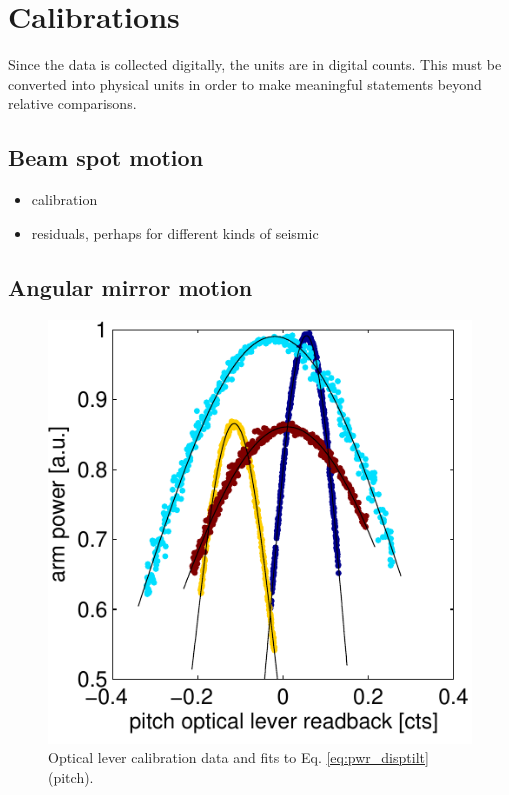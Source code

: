 \section{Calibrations}
Since the data is collected digitally, the units are in digital
counts. This must be converted into physical units in order to make
meaningful statements beyond relative comparisons.

\subsection{Beam spot motion}
\begin{itemize} 
\item calibration
\item residuals, perhaps for different kinds of seismic
\end{itemize}

\subsection{Angular mirror motion}


\begin{figure}
\begin{centering}
\includegraphics[width=1.0\columnwidth]{figures/OLcal_pitch.pdf}
\caption{Optical lever calibration data and fits to Eq. \ref{eq:pwr_disptilt} (pitch).}
\end{centering}
\end{figure}


